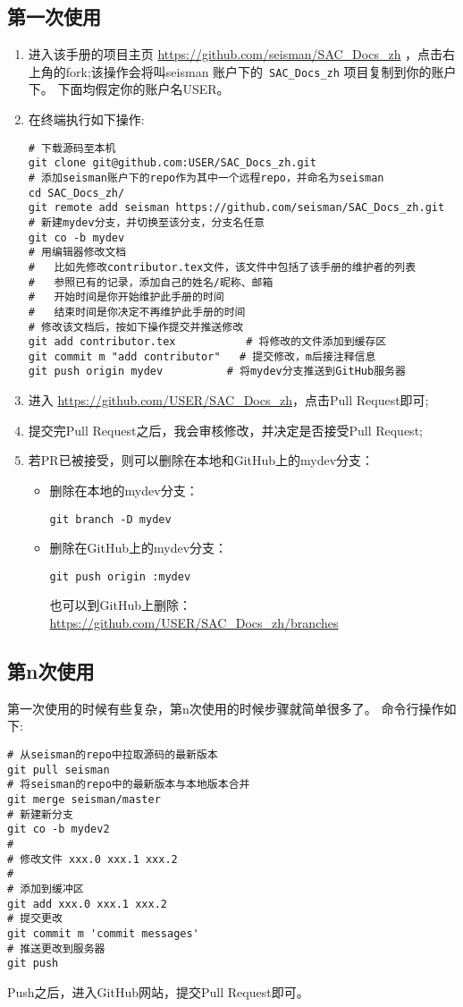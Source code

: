 \subsection{第一次使用}
\begin{enumerate}
\item 进入该手册的项目主页 \url{https://github.com/seisman/SAC_Docs_zh}
，点击右上角的fork;该操作会将叫seisman 账户下的~\verb+SAC_Docs_zh+ 项目复制到你的账户下。
下面均假定你的账户名USER。
\item 在终端执行如下操作:
\begin{verbatim}
# 下载源码至本机
git clone git@github.com:USER/SAC_Docs_zh.git
# 添加seisman账户下的repo作为其中一个远程repo，并命名为seisman
cd SAC_Docs_zh/
git remote add seisman https://github.com/seisman/SAC_Docs_zh.git
# 新建mydev分支，并切换至该分支，分支名任意
git co -­b mydev
# 用编辑器修改文档
#   比如先修改contributor.tex文件，该文件中包括了该手册的维护者的列表
#   参照已有的记录，添加自己的姓名/昵称、邮箱
#   开始时间是你开始维护此手册的时间
#   结束时间是你决定不再维护此手册的时间
# 修改该文档后，按如下操作提交并推送修改
git add contributor.tex           # 将修改的文件添加到缓存区
git commit ­m "add contributor"   # 提交修改，­m后接注释信息
git push origin mydev          # 将mydev分支推送到GitHub服务器
\end{verbatim}
\item 进入 \url{https://github.com/USER/SAC_Docs_zh}，点击Pull Request即可;
\item 提交完Pull Request之后，我会审核修改，并决定是否接受Pull Request;
\item 若PR已被接受，则可以删除在本地和GitHub上的mydev分支：
\begin{itemize}
\item 删除在本地的mydev分支：
\begin{verbatim}
git branch -D mydev
\end{verbatim}
\item 删除在GitHub上的mydev分支：
\begin{verbatim}
git push origin :mydev
\end{verbatim}
也可以到GitHub上删除：\url{https://github.com/USER/SAC_Docs_zh/branches}
\end{itemize}
\end{enumerate}
\subsection{第n次使用}
第一次使用的时候有些复杂，第n次使用的时候步骤就简单很多了。
命令行操作如下:
\begin{verbatim}
# 从seisman的repo中拉取源码的最新版本
git pull seisman
# 将seisman的repo中的最新版本与本地版本合并
git merge seisman/master
# 新建新分支
git co -b mydev2
#
# 修改文件 xxx.0 xxx.1 xxx.2
#
# 添加到缓冲区
git add xxx.0 xxx.1 xxx.2
# 提交更改
git commit ­m 'commit messages'
# 推送更改到服务器
git push
\end{verbatim}
Push之后，进入GitHub网站，提交Pull Request即可。
